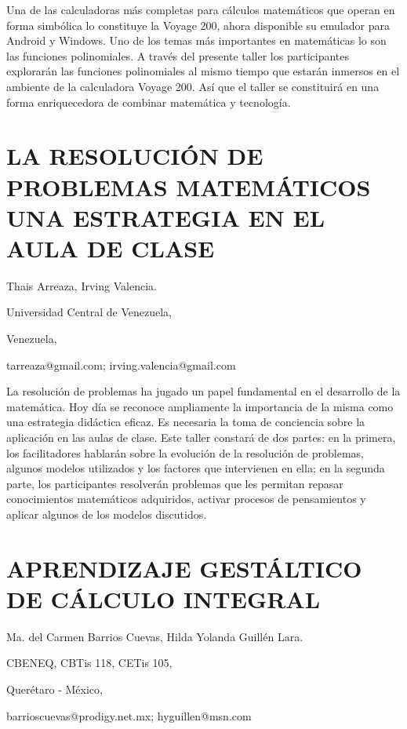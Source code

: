 Una de las calculadoras más completas para cálculos matemáticos que
operan en forma simbólica lo constituye la Voyage 200, ahora disponible
su emulador para Android y Windows. Uno de los temas más importantes
en matemáticas lo son las funciones polinomiales. A través del presente
taller los participantes explorarán las funciones polinomiales al
mismo tiempo que estarán inmersos en el ambiente de la calculadora
Voyage 200. Así que el taller se constituirá en una forma enriquecedora
de combinar matemática y tecnología.


\section{LA RESOLUCIÓN DE PROBLEMAS MATEMÁTICOS UNA ESTRATEGIA EN EL AULA
DE CLASE }

\begin{datos}

Thais Arreaza, Irving Valencia.

Universidad Central de Venezuela,

Venezuela,

tarreaza@gmail.com; irving.valencia@gmail.com

\end{datos}

La resolución de problemas ha jugado un papel fundamental en el desarrollo
de la matemática. Hoy día se reconoce ampliamente la importancia de
la misma como una estrategia didáctica eficaz. Es necesaria la toma
de conciencia sobre la aplicación en las aulas de clase. Este taller
constará de dos partes: en la primera, los facilitadores hablarán
sobre la evolución de la resolución de problemas, algunos modelos
utilizados y los factores que intervienen en ella; en la segunda parte,
los participantes resolverán problemas que les permitan repasar conocimientos
matemáticos adquiridos, activar procesos de pensamientos y aplicar
algunos de los modelos discutidos. 


\section{APRENDIZAJE GESTÁLTICO DE CÁLCULO INTEGRAL }

\begin{datos}

Ma. del Carmen Barrios Cuevas, Hilda Yolanda Guillén Lara.

CBENEQ, CBTis 118, CETis 105,

Querétaro - México,

barrioscuevas@prodigy.net.mx; hyguillen@msn.com

\end{datos}

